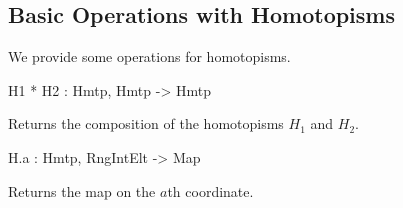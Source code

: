 \subsection{Basic Operations with Homotopisms}

We provide some operations for homotopisms.

\begin{intrinsics}
H1 * H2 : Hmtp, Hmtp -> Hmtp
\end{intrinsics}

Returns the composition of the homotopisms $H_1$ and $H_2$.

\begin{intrinsics}
H.a : Hmtp, RngIntElt -> Map
\end{intrinsics}

Returns the map on the $a$th coordinate.

